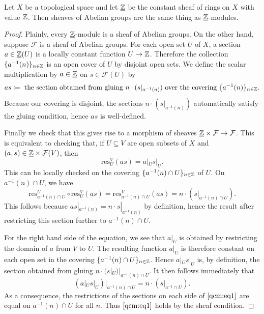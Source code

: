 \begin{proposition}
	Let $X$ be a topological space and let $\underline{\mathbb Z}$ be the constant sheaf of rings on $X$ with value $\mathbb Z$. Then sheaves of Abelian groups are the same thing as $\underline{\mathbb Z}$-modules.
\end{proposition}
\begin{proof}
	Plainly, every $\underline{\mathbb Z}$-module is a sheaf of Abelian groups. On the other hand, suppose $\mathcal{F}$ is a sheaf of Abelian groups. For each open set $U$ of $X$, a section $a \in\underline{\mathbb Z}(U)$ is a locally constant function $U \to \mathbb Z$. Therefore the collection $\lbrace a^{-1}(n)\rbrace_{n \in \mathbb Z}$ is an open cover of $U$ by disjoint open sets. We define the scalar multiplication by $a \in \underline{\mathbb Z}$ on $s \in \mathcal{F}(U)$ by
	\begin{equation*}
		as \coloneqq \text{ the section obtained from gluing $n \cdot (s|_{a^{-1}(n)})$ over the covering $\lbrace a^{-1}(n)\rbrace_{n \in \mathbb Z}$.} 
	\end{equation*}
	Because our covering is disjoint, the sections $n \cdot (s|_{a^{-1}(n)})$ automatically satisfy the gluing condition, hence $as$ is well-defined. 
	
	Finally we check that this gives rise to a morphism of sheaves $\underline{\mathbb Z} \times \mathcal{F} \to \mathcal{F}$. This is equivalent to checking that, if $U \subseteq V$ are open subsets of $X$ and $(a, s) \in \underline{\mathbb Z} \times \mathcal{F}(V)$, then 
	\begin{equation}\label{qcm:eq1}
		\mathrm{res}^V_U(as) = a|_U s|_U.
	\end{equation}
	This can be locally checked on the covering $\lbrace a^{-1}(n) \cap U\rbrace_{n \in \mathbb Z}$ of $U$. On $a^{-1}(n) \cap U$, we have
	\begin{equation*}
		\mathrm{res}^{U}_{a^{-1}(n) \cap U} \circ \mathrm{res}^V_{U}(as) = \mathrm{res}^V_{a^{-1}(n) \cap U}(as) = n\cdot (s|_{a^{-1}(n) \cap U}).
	\end{equation*}
	This follows because $as|_{a^{-1}(n)} = n \cdot s|_{a^{-1}(n)}$ by definition, hence the result after restricting this section further to $a^{-1}(n) \cap U$.
	
	For the right hand side of the equation, we see that $a|_U$ is obtained by restricting the domain of $a$ from $V$ to $U$. The resulting function $a|_U$ is therefore constant on each open set in the covering $\lbrace a^{-1}(n) \cap U\rbrace_{n \in \mathbb Z}$. Hence $a|_U s|_U$ is, by definition, the section obtained from gluing $n \cdot (s|_{U})|_{a^{-1}(n) \cap U}$. It then follows immediately that
	\begin{equation*}
		(a|_{U} s|_{U})|_{a^{-1}(n) \cap U} = n \cdot (s|_{a^{-1} \cap U}).
	\end{equation*}
	As a consequence, the restrictions of the sections on each side of $\ref{qcm:eq1}$ are equal on $a^{-1}(n) \cap U$ for all $n$. Thus $\ref{qcm:eq1}$ holds by the sheaf condition. 
	

\end{proof}
